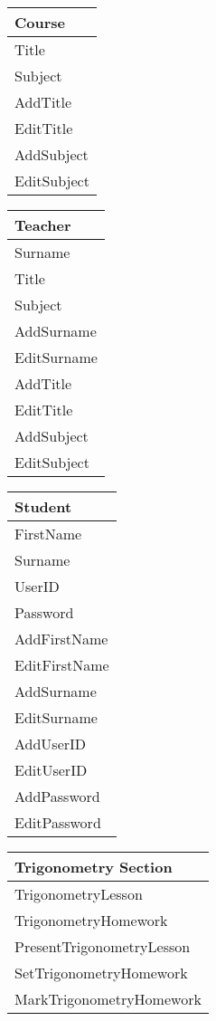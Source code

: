 \begin{center}
\begin{tabular}{|p{5cm}|} \hline
Course \\ \hline
Title \\
Subject \\ \hline
AddTitle \\ 
EditTitle \\
AddSubject \\
EditSubject \\ \hline
\end{tabular}
\end{center}

\begin{center}
\begin{tabular}{|p{5cm}|} \hline
Teacher \\ \hline
Surname \\
Title \\
Subject \\ \hline
AddSurname \\
EditSurname \\
AddTitle \\
EditTitle \\
AddSubject \\
EditSubject \\ \hline
\end{tabular}
\end{center}

\begin{center}
\begin{tabular}{|p{5cm}|} \hline
Student \\ \hline
FirstName \\
Surname \\
UserID \\
Password  \\ \hline
AddFirstName \\
EditFirstName \\
AddSurname \\
EditSurname \\
AddUserID \\
EditUserID \\
AddPassword \\
EditPassword \\ \hline
\end{tabular}
\end{center}

\begin{center}
\begin{tabular}{|p{5cm}|} \hline
Trigonometry Section \\ \hline
TrigonometryLesson \\
TrigonometryHomework \\ \hline
PresentTrigonometryLesson \\
SetTrigonometryHomework \\
MarkTrigonometryHomework \\ \hline
\end{tabular}
\end{center}

